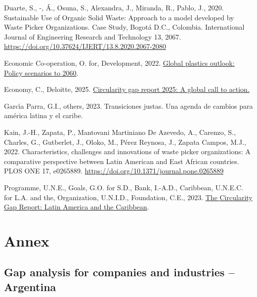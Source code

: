 \documentclass[
  12pt,
  oneside]{book}
\newlength{\cslhangindent}
\newenvironment{CSLReferences}[2] %
 {\begin{list}{}{%
  \setlength{\itemindent}{0pt}
  \setlength{\leftmargin}{0pt}
  \setlength{\parsep}{0pt}
  \ifodd #1
   \setlength{\leftmargin}{\cslhangindent}
   \setlength{\itemindent}{-1\cslhangindent}
  \fi
  \setlength{\itemsep}{#2\baselineskip}}}
 {\end{list}}
\begin{document}
\begin{CSLReferences}{1}{0}
Duarte, S., -, Á., Osuna, S., Alexandra, J., Miranda, R., Pablo, J.,
2020. Sustainable {Use} of {Organic Solid Waste}: Approach to a model
developed by {Waste Picker Organizations}. {Case Study}, {Bogot{á}
D}.{C}., {Colombia}. International Journal of Engineering Research and
Technology 13, 2067.
\url{https://doi.org/10.37624/IJERT/13.8.2020.2067-2080}

Economic Co-operation, O. for, Development, 2022.
\href{https://doi.org/10.1787/aa1edf33-en}{Global plastics outlook:
Policy scenarios to 2060}.

Economy, C., Deloitte, 2025.
\href{https://global.circularity-gap.world/report.pdf}{Circularity gap
report 2025: A global call to action.}

{Garcı́a Parra, G.I., others}, 2023. Transiciones justas. Una agenda de
cambios para am{é}rica latina y el caribe.

Kain, J.-H., Zapata, P., Mantovani Martiniano De Azevedo, A., Carenzo,
S., Charles, G., Gutberlet, J., Oloko, M., Pérez Reynosa, J., Zapata
Campos, M.J., 2022. Characteristics, challenges and innovations of waste
picker organizations: {A} comparative perspective between {Latin
American} and {East African} countries. PLOS ONE 17, e0265889.
\url{https://doi.org/10.1371/journal.pone.0265889}

Programme, U.N.E., Goals, G.O. for S.D., Bank, I.-A.D., Caribbean,
U.N.E.C. for L.A. and the, Organization, U.N.I.D., Foundation, C.E.,
2023. \href{https://wedocs.unep.org/xmlui/handle/20.500.11822/44119}{The
{Circularity Gap Report}: {Latin America} and the {Caribbean}}.

\end{CSLReferences}

\appendix

\chapter{Annex}\label{annex}

\section{Gap analysis for companies and industries --
Argentina}\label{gap-analysis-for-companies-and-industries-argentina}
\end{document}
